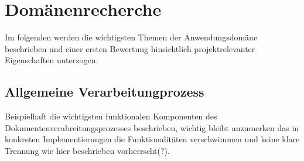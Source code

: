 \chapter{Domänenrecherche}
\label{cha:domaene}

\begin{comment}
Die Domänenrecherche zeigt auf in welcher Domäne das System zukünftig eingesetzt werden soll. Dabei soll recherchiert werden welche wichtigen Konzepte der Anwendungsdomäne eine Rolle bei der Gestaltung des Systems spielen. Es werden zudem sämtliche Informationen, Vorgänge, Metaphern und Paradigmen aus der Domäne recherchiert, in dem sich das zu entwickelnde System befindet. Die Domänenrecherche bildet die Basis für die Entwicklung eines Nutzungsproblems und der nachfolgenden Konzeption des gesamten Systems. 
\end{comment}

Im folgenden werden die wichtigsten Themen der Anwendungsdomäne beschrieben und einer ersten Bewertung
hinsichtlich projektrelevanter Eigenschaften unterzogen.



\section{Allgemeine Verarbeitungprozess}
\label{sec:domaene-prozess}
%

Beispielhaft die wichtigsten funktionalen Komponenten des Dokumentenverabreitungsprozesses beschrieben, wichtig bleibt anzumerken
das in konkreten Implementierungen die Funktionalitäten verschwimmen und keine klare Trennung wie hier beschrieben vorherrscht(?). 
%
%

